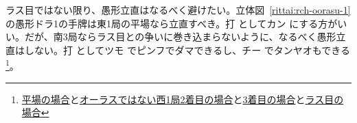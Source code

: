 \documentclass[../nankiru_main.tex]{subfiles}
\begin{document}
ラス目ではない限り、愚形立直はなるべく避けたい。立体図~\ref{rittai:rch-oorasu-1} の愚形ドラ1の手牌は東1局の平場なら立直すべき。打  としてカン  にする方がいい。だが、南3局ならラス目との争いに巻き込まらないように、なるべく愚形立直はしない。打  としてツモ  でピンフでダマできるし、チー  でタンヤオもできる\footnote{\href{https://naga.dmv.nico/htmls/0c207c8cb7f8fc58007c47be9f07ac713f31f8b82dcb021bec2774e663713193v2_2.html?tw=0}{平場の場合}と\href{https://naga.dmv.nico/htmls/023a1fe00f263fb68fbfffb033a261290e983b618ffbaa183232933ea7caa0e4v2_2.html?tw=0}{オーラスではない西1局2着目の場合}と\href{https://naga.dmv.nico/htmls/8b4d5d8a0942396bb0b6434984fa1e475a8201ab26dbbb77be49d03fc05865eav2_2.html?tw=0}{3着目の場合}と\href{https://naga.dmv.nico/htmls/2d12d86aa6f0ca0010be83dc28f40de83de498f5ed75340462a254e4007a65dav2_2.html?tw=0}{ラス目の場合}}。

\begin{rittai}[h]
  \centering
  \caption{}
  \label{rittai:rch-oorasu-1}
\end{rittai}
\end{document}
